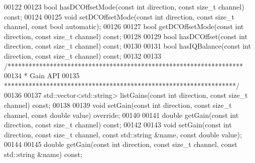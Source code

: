 \begin{DoxyCode}
00122 
00123     \textcolor{keywordtype}{bool} hasDCOffsetMode(\textcolor{keyword}{const} \textcolor{keywordtype}{int} direction, \textcolor{keyword}{const} \textcolor{keywordtype}{size\_t} channel) \textcolor{keyword}{const};
00124 
00125     \textcolor{keywordtype}{void} setDCOffsetMode(\textcolor{keyword}{const} \textcolor{keywordtype}{int} direction, \textcolor{keyword}{const} \textcolor{keywordtype}{size\_t} channel, \textcolor{keyword}{const} \textcolor{keywordtype}{bool} automatic);
00126 
00127     \textcolor{keywordtype}{bool} getDCOffsetMode(\textcolor{keyword}{const} \textcolor{keywordtype}{int} direction, \textcolor{keyword}{const} \textcolor{keywordtype}{size\_t} channel) \textcolor{keyword}{const};
00128 
00129     \textcolor{keywordtype}{bool} hasDCOffset(\textcolor{keyword}{const} \textcolor{keywordtype}{int} direction, \textcolor{keyword}{const} \textcolor{keywordtype}{size\_t} channel) \textcolor{keyword}{const};
00130 
00131     \textcolor{keywordtype}{bool} hasIQBalance(\textcolor{keyword}{const} \textcolor{keywordtype}{int} direction, \textcolor{keyword}{const} \textcolor{keywordtype}{size\_t} channel) \textcolor{keyword}{const};
00132 
00133     \textcolor{comment}{/*******************************************************************}
00134 \textcolor{comment}{     * Gain API}
00135 \textcolor{comment}{     ******************************************************************/}
00136 
00137     std::vector<std::string> listGains(\textcolor{keyword}{const} \textcolor{keywordtype}{int} direction, \textcolor{keyword}{const} \textcolor{keywordtype}{size\_t} channel) \textcolor{keyword}{const};
00138 
00139     \textcolor{keywordtype}{void} setGain(\textcolor{keyword}{const} \textcolor{keywordtype}{int} direction, \textcolor{keyword}{const} \textcolor{keywordtype}{size\_t} channel, \textcolor{keyword}{const} \textcolor{keywordtype}{double} value) \textcolor{keyword}{override};
00140     
00141     \textcolor{keywordtype}{double} getGain(\textcolor{keyword}{const} \textcolor{keywordtype}{int} direction, \textcolor{keyword}{const} \textcolor{keywordtype}{size\_t} channel) \textcolor{keyword}{const};
00142 
00143     \textcolor{keywordtype}{void} setGain(\textcolor{keyword}{const} \textcolor{keywordtype}{int} direction, \textcolor{keyword}{const} \textcolor{keywordtype}{size\_t} channel, \textcolor{keyword}{const} std::string &name, \textcolor{keyword}{const} \textcolor{keywordtype}{double} value);
00144 
00145     \textcolor{keywordtype}{double} getGain(\textcolor{keyword}{const} \textcolor{keywordtype}{int} direction, \textcolor{keyword}{const} \textcolor{keywordtype}{size\_t} channel, \textcolor{keyword}{const} std::string &name) \textcolor{keyword}{const};

\end{DoxyCode}
